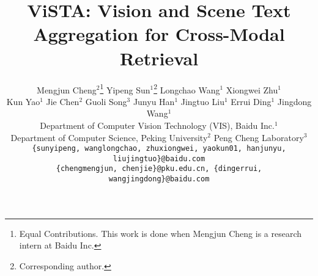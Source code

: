 \documentclass[10pt,twocolumn,letterpaper]{article}
\begin{document}
\title{ViSTA: Vision and Scene Text Aggregation for Cross-Modal Retrieval}


\makeatletter
\newcommand{\printfnsymbol}[1]{\textsuperscript{\@fnsymbol{#1}}}
\makeatother

\author{Mengjun Cheng$^{2}$\thanks{\noindent Equal Contributions. This work is done when Mengjun Cheng is a research intern at Baidu Inc.} \quad Yipeng Sun$^1$\printfnsymbol{1}\thanks{Corresponding author.} \quad Longchao Wang$^1$ \quad Xiongwei Zhu$^1$ \\
\quad Kun Yao$^1$ \quad Jie Chen$^2$ \quad Guoli Song$^3$ \quad Junyu Han$^1$ \quad Jingtuo Liu$^1$ \quad Errui Ding$^1$ \quad Jingdong Wang$^1$\\
Department of Computer Vision Technology (VIS), Baidu Inc.$^1$ \\
\quad Department of Computer Science, Peking University$^2$ \quad Peng Cheng Laboratory$^3$\\
{\tt\small \{sunyipeng, wanglongchao, zhuxiongwei, yaokun01, hanjunyu, liujingtuo\}@baidu.com}\\
{\tt\small \{chengmengjun, chenjie\}@pku.edu.cn, \tt\small \{dingerrui, wangjingdong\}@baidu.com}}
\maketitle
\end{document}

